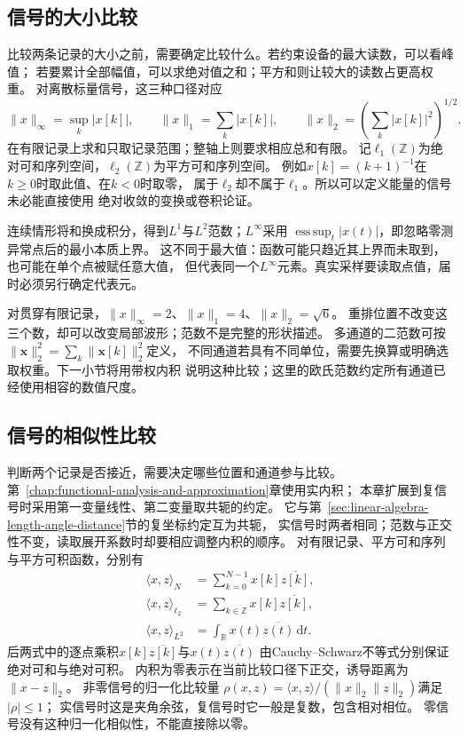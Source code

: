 \subsection{信号的大小比较}

比较两条记录的大小之前，需要确定比较什么。若约束设备的最大读数，可以看峰值；
若要累计全部幅值，可以求绝对值之和；平方和则让较大的读数占更高权重。
对离散标量信号，这三种口径对应
\[
  \|x\|_\infty=\sup_k|x[k]|,\qquad
  \|x\|_1=\sum_k|x[k]|,\qquad
  \|x\|_2=\left(\sum_k|x[k]|^2\right)^{1/2}.
\]
在有限记录上求和只取记录范围；整轴上则要求相应总和有限。
记$\ell_1(\mathbb Z)$为绝对可和序列空间，$\ell_2(\mathbb Z)$为平方可和序列空间。
例如$x[k]=(k+1)^{-1}$在$k\geq0$时取此值、在$k<0$时取零，
属于$\ell_2$却不属于$\ell_1$。所以可以定义能量的信号未必能直接使用
绝对收敛的变换或卷积论证。

连续情形将和换成积分，得到$L^1$与$L^2$范数；$L^\infty$采用
$\operatorname*{ess\,sup}_t|x(t)|$，即忽略零测异常点后的最小本质上界。
这不同于最大值：函数可能只趋近其上界而未取到，也可能在单个点被赋任意大值，
但代表同一个$L^\infty$元素。真实采样要读取点值，届时必须另行确定代表元。

对贯穿有限记录，$\|x\|_\infty=2$、$\|x\|_1=4$、$\|x\|_2=\sqrt6$。
重排位置不改变这三个数，却可以改变局部波形；范数不是完整的形状描述。
多通道的二范数可按
$\|\bm x\|_2^2=\sum_k\|\bm x[k]\|_2^2$定义，
不同通道若具有不同单位，需要先换算或明确选取权重。下一小节将用带权内积
说明这种比较；这里的欧氏范数约定所有通道已经使用相容的数值尺度。

\subsection{信号的相似性比较}

判断两个记录是否接近，需要决定哪些位置和通道参与比较。
第~\ref{chap:functional-analysis-and-approximation}章使用实内积；
本章扩展到复信号时采用第一变量线性、第二变量取共轭的约定。
它与第~\ref{sec:linear-algebra-length-angle-distance}节的复坐标约定互为共轭，
实信号时两者相同；范数与正交性不变，读取展开系数时却要相应调整内积的顺序。
对有限记录、平方可和序列与平方可积函数，分别有
\begin{equation}
  \begin{aligned}
    \langle x,z\rangle_N&=\sum_{k=0}^{N-1}x[k]\overline{z[k]},\\
    \langle x,z\rangle_{\ell_2}&=\sum_{k\in\mathbb Z}x[k]\overline{z[k]},\\
    \langle x,z\rangle_{L^2}&=\int_{\mathbb R}x(t)\overline{z(t)}\,\mathrm dt.
  \end{aligned}
  \label{eq:signal-inner-products}
\end{equation}
后两式中的逐点乘积$x[k]\overline{z[k]}$与$x(t)\overline{z(t)}$
由Cauchy--Schwarz不等式分别保证绝对可和与绝对可积。
内积为零表示在当前比较口径下正交，诱导距离为$\|x-z\|_2$。
非零信号的归一化比较量
$\rho(x,z)=\langle x,z\rangle/(\|x\|_2\|z\|_2)$满足$|\rho|\leq1$；
实信号时这是夹角余弦，复信号时它一般是复数，包含相对相位。
零信号没有这种归一化相似性，不能直接除以零。

